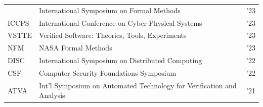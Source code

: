 {{\begin{tabular}
			{FM} & {International Symposium on Formal Methods}&{'23}\\
			{ICCPS} & {International Conference on Cyber-Physical Systems}& {'23} \\
			{VSTTE} & {Verified Software: Theories, Tools, Experiments}& {'23}\\
			{NFM} & {NASA Formal Methods}&{'23}\\
			{DISC} & {International Symposium on Distributed Computing}&{'22}\\
			{CSF} & {Computer Security Foundations Symposium}&{'22}\\
			{ATVA} & {Int'l Symposium on Automated Technology for Verification and Analysis}&{'21}
		\end{tabular}
		
	 }	
	\vspace*{.6mm}
	 }

